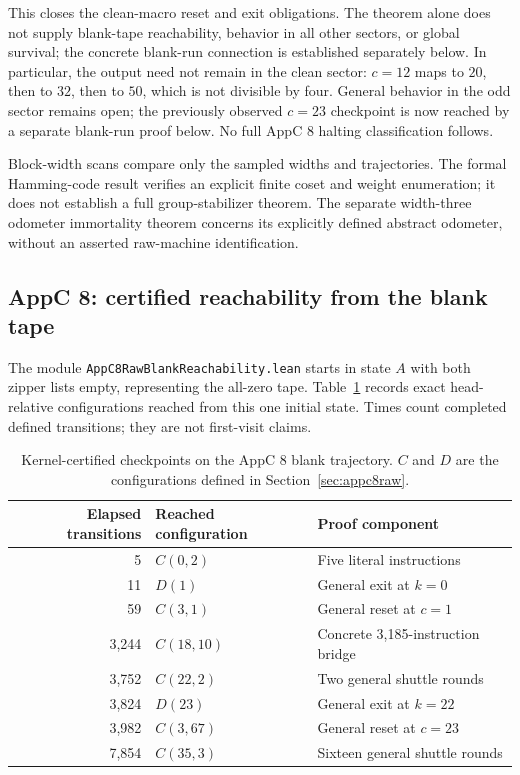 \documentclass[11pt]{article}
\DeclareRobustCommand{\_}{\ifmmode\sb\else\textunderscore\allowbreak\fi}
\theoremstyle{definition}
\theoremstyle{remark}
\begin{document}
This closes the clean-macro reset and exit obligations. The theorem alone does not supply blank-tape reachability, behavior in all other sectors, or global survival; the concrete blank-run connection is established separately below. In particular, the output need not remain in the clean sector: $c=12$ maps to $20$, then to $32$, then to $50$, which is not divisible by four. General behavior in the odd sector remains open; the previously observed $c=23$ checkpoint is now reached by a separate blank-run proof below. No full AppC 8 halting classification follows.

Block-width scans compare only the sampled widths and trajectories. The formal Hamming-code result verifies an explicit finite coset and weight enumeration; it does not establish a full group-stabilizer theorem. The separate width-three odometer immortality theorem concerns its explicitly defined abstract odometer, without an asserted raw-machine identification.

\subsection{AppC 8: certified reachability from the blank tape}
\label{sec:appc8blank}
The module \texttt{AppC8RawBlankReachability.lean} starts in state $A$ with both zipper lists empty, representing the all-zero tape. Table~\ref{tab:appc8blank} records exact head-relative configurations reached from this one initial state. Times count completed defined transitions; they are not first-visit claims.

\begin{table}[htbp]
\centering\small
\begin{tabular}{rll}
\toprule
Elapsed transitions & Reached configuration & Proof component \\
\midrule
5 & $C(0,2)$ & Five literal instructions \\
11 & $D(1)$ & General exit at $k=0$ \\
59 & $C(3,1)$ & General reset at $c=1$ \\
3,244 & $C(18,10)$ & Concrete 3,185-instruction bridge \\
3,752 & $C(22,2)$ & Two general shuttle rounds \\
3,824 & $D(23)$ & General exit at $k=22$ \\
3,982 & $C(3,67)$ & General reset at $c=23$ \\
7,854 & $C(35,3)$ & Sixteen general shuttle rounds \\
\bottomrule
\end{tabular}
\caption{Kernel-certified checkpoints on the AppC 8 blank trajectory. $C$ and $D$ are the configurations defined in Section~\ref{sec:appc8raw}.}
\label{tab:appc8blank}
\end{table}
\end{document}
